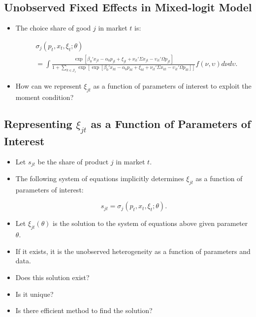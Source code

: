 \documentclass[]{book}
\providecommand{\tightlist}{%
  \setlength{\itemsep}{0pt}\setlength{\parskip}{0pt}}
\begin{document}
\subsection{Unobserved Fixed Effects in Mixed-logit
Model}\label{unobserved-fixed-effects-in-mixed-logit-model}

\begin{itemize}
\tightlist
\item
  The choice share of good \(j\) in market \(t\) is:

  \begin{equation}
  \begin{split}
  &\sigma_{j}(p_t, x_t, \xi_t; \theta)\\
  &= \int \frac{\exp[\beta_0' x_{jt} - \alpha_0 p_{jt} + \xi_{jt} + \nu_{it}' \Sigma x_{jt} - \upsilon_{it}' \Omega p_{jt}]}{1 + \sum_{k \in \mathcal{J}_t} \exp[\exp[\beta_0' x_{kt} - \alpha_0 p_{kt} + \xi_{kt} + \nu_{it}' \Sigma x_{kt} - \upsilon_{it}' \Omega p_{kt}]]} f(\nu, \upsilon) d \nu d \upsilon.
  \end{split}
  \end{equation}
\item
  How can we represent \(\xi_{jt}\) as a function of parameters of
  interest to exploit the moment condition?
\end{itemize}

\subsection{\texorpdfstring{Representing \(\xi_{jt}\) as a Function of
Parameters of
Interest}{Representing \textbackslash{}xi\_\{jt\} as a Function of Parameters of Interest}}\label{representing-xi_jt-as-a-function-of-parameters-of-interest}

\begin{itemize}
\tightlist
\item
  Let \(s_{jt}\) be the share of product \(j\) in market \(t\).
\item
  The following system of equations implicitly determines \(\xi_{jt}\)
  as a function of parameters of interest:

  \begin{equation}
  s_{jt} = \sigma_j(p_t, x_t, \xi_t; \theta).
  \end{equation}
\item
  Let \(\xi_{jt}(\theta)\) is the solution to the system of equations
  above given parameter \(\theta\).
\item
  If it exists, it is the unobserved heterogeneity as a function of
  parameters and data.
\item
  Does this solution exist?
\item
  Is it unique?
\item
  Is there efficient method to find the solution?
\end{itemize}
\end{document}
